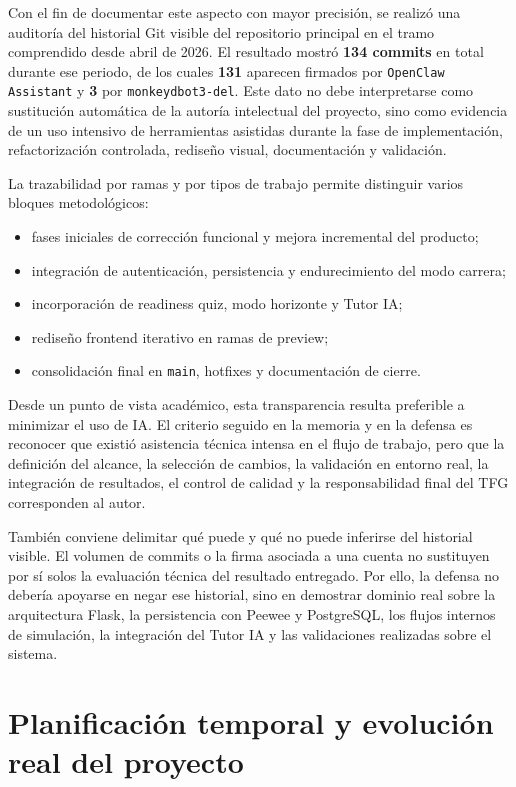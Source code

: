 Con el fin de documentar este aspecto con mayor precisión, se realizó una auditoría del historial Git visible del repositorio principal en el tramo comprendido desde abril de 2026. El resultado mostró \textbf{134 commits} en total durante ese periodo, de los cuales \textbf{131} aparecen firmados por \texttt{OpenClaw Assistant} y \textbf{3} por \texttt{monkeydbot3-del}. Este dato no debe interpretarse como sustitución automática de la autoría intelectual del proyecto, sino como evidencia de un uso intensivo de herramientas asistidas durante la fase de implementación, refactorización controlada, rediseño visual, documentación y validación.

La trazabilidad por ramas y por tipos de trabajo permite distinguir varios bloques metodológicos:

\begin{itemize}
    \item fases iniciales de corrección funcional y mejora incremental del producto;
    \item integración de autenticación, persistencia y endurecimiento del modo carrera;
    \item incorporación de readiness quiz, modo horizonte y Tutor IA;
    \item rediseño frontend iterativo en ramas de preview;
    \item consolidación final en \texttt{main}, hotfixes y documentación de cierre.
\end{itemize}

Desde un punto de vista académico, esta transparencia resulta preferible a minimizar el uso de IA. El criterio seguido en la memoria y en la defensa es reconocer que existió asistencia técnica intensa en el flujo de trabajo, pero que la definición del alcance, la selección de cambios, la validación en entorno real, la integración de resultados, el control de calidad y la responsabilidad final del TFG corresponden al autor.

También conviene delimitar qué puede y qué no puede inferirse del historial visible. El volumen de commits o la firma asociada a una cuenta no sustituyen por sí solos la evaluación técnica del resultado entregado. Por ello, la defensa no debería apoyarse en negar ese historial, sino en demostrar dominio real sobre la arquitectura Flask, la persistencia con Peewee y PostgreSQL, los flujos internos de simulación, la integración del Tutor IA y las validaciones realizadas sobre el sistema.

\section{Planificación temporal y evolución real del proyecto}

